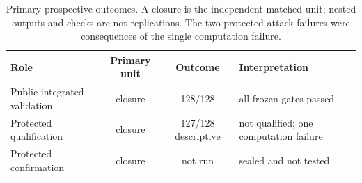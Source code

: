 \begin{table}[t]
\caption{Primary prospective outcomes. A closure is the independent matched
unit; nested outputs and checks are not replications. The two protected attack
failures were consequences of the single computation failure.}
\label{tab:results}
\centering
\small
\begin{tabularx}{\linewidth}{@{}YccY@{}}
\toprule
Role & Primary unit & Outcome & Interpretation \\
\midrule
Public integrated validation & closure & 128/128 & all frozen gates passed \\
Protected qualification & closure & 127/128 descriptive & not qualified; one computation failure \\
Protected confirmation & closure & not run & sealed and not tested \\
\bottomrule
\end{tabularx}
\end{table}
